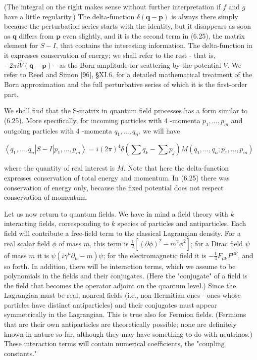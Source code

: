 \documentclass[10pt, letterpaper]{article}
\begin{document}
(The integral on the right makes sense without further interpretation if $f$ and $g$ have a little regularity.) The delta-function $\delta(\mathbf{q}-\mathbf{p})$ is always there simply because the perturbation series starts with the identity, but it disappears as soon as $\mathbf{q}$ differs from $\mathbf{p}$ even slightly, and it is the second term in (6.25), the matrix element for $S-I$, that contains the interesting information. The delta-function in it expresses conservation of energy; we shall refer to the rest - that is, $-2 \pi i \widehat{V}(\mathbf{q}-\mathbf{p})$ - as the Born amplitude for scattering by the potential $V$. We refer to Reed and Simon [96], §XI.6, for a detailed mathematical treatment of the Born approximation and the full perturbative series of which it is the first-order part.

We shall find that the S-matrix in quantum field processes has a form similar to (6.25). More specifically, for incoming particles with 4 -momenta $p_{1}, \ldots, p_{m}$ and outgoing particles with 4 -momenta $q_{1}, \ldots, q_{n}$, we will have

$$
\left\langle q_{1}, \ldots, q_{n}\right| S-I\left|p_{1}, \ldots, p_{m}\right\rangle=i(2 \pi)^{4} \delta\left(\sum q_{k}-\sum p_{j}\right) M\left(q_{1}, \ldots, q_{n} ; p_{1}, \ldots, p_{m}\right)
$$

where the quantity of real interest is $M$. Note that here the delta-function expresses conservation of total energy and momentum. In (6.25) there was conservation of energy only, because the fixed potential does not respect conservation of momentum.

Let us now return to quantum fields. We have in mind a field theory with $k$ interacting fields, corresponding to $k$ species of particles and antiparticles. Each field will contribute a free-field term to the classical Lagrangian density. For a real scalar field $\phi$ of mass $m$, this term is $\frac{1}{2}\left[(\partial \phi)^{2}-m^{2} \phi^{2}\right]$; for a Dirac field $\psi$ of mass $m$ it is $\bar{\psi}\left(i \gamma^{\mu} \partial_{\mu}-m\right) \psi$; for the electromagnetic field it is $-\frac{1}{4} F_{\mu \nu} F^{\mu \nu}$, and so forth. In addition, there will be interaction terms, which we assume to be polynomials in the fields and their conjugates. (Here the "conjugate" of a field is the field that becomes the operator adjoint on the quantum level.) Since the Lagrangian must be real, nonreal fields (i.e., non-Hermitian ones - ones whose particles have distinct antiparticles) and their conjugates must appear symmetrically in the Lagrangian. This is true also for Fermion fields. (Fermions that are their own antiparticles are theoretically possible; none are definitely known in nature so far, although they may have something to do with neutrinos.) These interaction terms will contain numerical coefficients, the "coupling constants."
\end{document}
